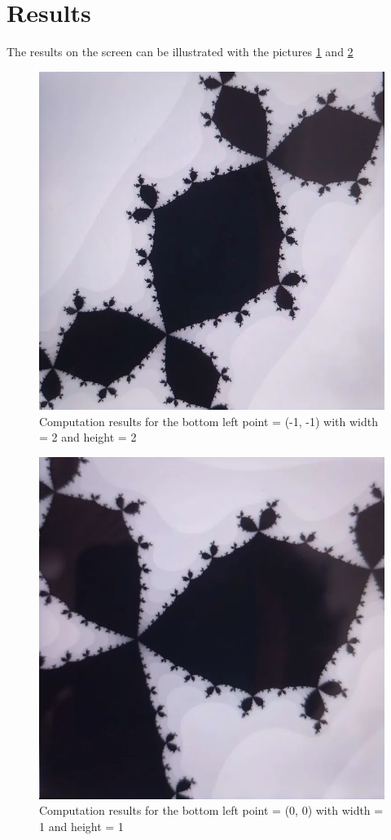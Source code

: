 \section{Results}
    The results on the screen can be illustrated with the pictures \ref{fig:result_11_22} and \ref{fig:result_00_11}
        \begin{figure}[H]
            \centering
            \includegraphics[width=0.8\linewidth]{images/result_11_22.png}
            \caption{Computation results for the bottom left point = (-1, -1) with width = 2 and height = 2}
            \label{fig:result_11_22}
        \end{figure}
        \begin{figure}[H]
            \centering
            \includegraphics[width=0.8\linewidth]{images/result_00_11.png}
            \caption{Computation results for the bottom left point = (0, 0) with width = 1 and height = 1}
            \label{fig:result_00_11}
        \end{figure}
